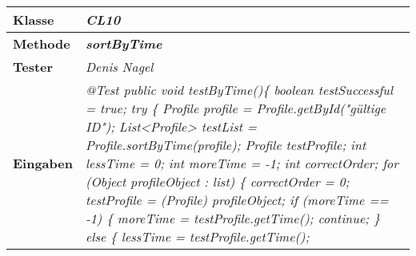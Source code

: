 \begin{longtable}{|p{4cm}|p{11cm}|}
\hline
\textbf{Klasse} & \textit{\textbf{CL10}} \\
\hline
\textbf{Methode} & \textit{\textbf{sortByTime}} \\
\hline
\textbf{Tester} & \textit{Denis Nagel} \\
\hline
\textbf{Eingaben} & \textit{
@Test \newline
public void testByTime()\{ \newline
\hspace*{3mm}    boolean testSuccessful = true; \newline
\hspace*{3mm}    try \{ \newline
\hspace*{6mm}      	 Profile profile = Profile.getById("gültige ID"); \newline
\hspace*{6mm}        List<Profile> testList = Profile.sortByTime(profile); \newline
\hspace*{6mm}        Profile testProfile; \newline
\hspace*{6mm}        int lessTime = 0; \newline
\hspace*{6mm}        int moreTime = -1; \newline
\hspace*{6mm}        int correctOrder; \newline
\hspace*{6mm}        for (Object profileObject : list) \{ \newline
\hspace*{9mm}            correctOrder = 0; \newline
\hspace*{9mm}            testProfile = (Profile) profileObject; \newline
\hspace*{9mm}            if (moreTime == -1) \{ \newline
\hspace*{12mm}                moreTime = testProfile.getTime(); \newline
\hspace*{12mm}                continue; \newline
\hspace*{9mm}            \} else \{ \newline
\hspace*{12mm}                lessTime = testProfile.getTime(); \newline
}
\end{longtable}

